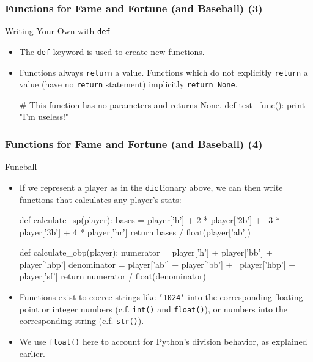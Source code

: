 \documentclass[10pt]{beamer}
\begin{document}
\begin{frame}[fragile]
  \frametitle{Functions for Fame and Fortune (and Baseball) (3)}
  \begin{block}{Writing Your Own with \texttt{def}}
    \begin{itemize}
      \item The \texttt{def} keyword is used to create new functions.
      \item Functions always \texttt{return} a value. 
        Functions which do not explicitly \texttt{return} a value (have no \texttt{return} statement) implicitly \texttt{return None}.
        \begin{pythoncode}
  # This function has no parameters and returns None.
  def test_func():
    print "I'm useless!"
        \end{pythoncode}
    \end{itemize}
  \end{block}
\end{frame}

\begin{frame}[fragile]
  \frametitle{Functions for Fame and Fortune (and Baseball) (4)}
  \begin{block}{Funcball}
    \begin{itemize}
      \item If we represent a player as in the \texttt{dict}ionary above, we can then write functions that calculates any player's stats:
        \footnotesize
        \begin{pythoncode}
  def calculate_sp(player):
    bases = player['h'] + 2 * player['2b'] + \
      3 * player['3b'] + 4 * player['hr']
    return bases / float(player['ab'])

  def calculate_obp(player):
    numerator = player['h'] + player['bb'] + player['hbp']
    denominator = player['ab'] + player['bb'] + \
      player['hbp'] + player['sf']
    return numerator / float(denominator)
        \end{pythoncode}
        \normalsize
      \item Functions exist to coerce strings like \texttt{'1024'} into the corresponding floating-point or integer numbers (c.f. \texttt{int()} and \texttt{float()}), or numbers into the corresponding string (c.f. \texttt{str()}).
      \item We use \texttt{float()} here to account for Python's division behavior, as explained earlier.
    \end{itemize}
  \end{block}
\end{frame}
\end{document}
